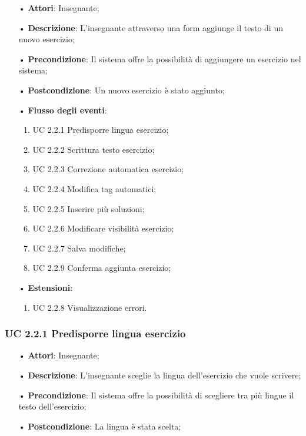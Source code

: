 \begin{itemize}
	\item[•] \textbf{Attori}: Insegnante;
	\item[•] \textbf{Descrizione}: L'insegnante attraverso una form aggiunge il testo di un nuovo esercizio;
	\item[•] \textbf{Precondizione}: Il sistema offre la possibilità di aggiungere un esercizio nel sistema;
	\item[•] \textbf{Postcondizione}: Un nuovo esercizio è stato aggiunto;
	\item[•] \textbf{Flusso degli eventi}:
	\begin{enumerate}
		\item UC 2.2.1 Predisporre lingua esercizio;
		\item UC 2.2.2 Scrittura testo esercizio;
		\item UC 2.2.3 Correzione automatica esercizio;
		\item UC 2.2.4 Modifica tag automatici;
		\item UC 2.2.5 Inserire più soluzioni;
		\item UC 2.2.6 Modificare visibilità esercizio;
		\item UC 2.2.7 Salva modifiche;
		\item UC 2.2.9 Conferma aggiunta esercizio;
	\end{enumerate}
	\item[•] \textbf{Estensioni}:	
	\begin{enumerate}
		\item UC 2.2.8 Visualizzazione errori.
	\end{enumerate}
\end{itemize}

\subsubsection{UC 2.2.1 Predisporre lingua esercizio}
\begin{itemize}
	\item[•] \textbf{Attori}: Insegnante;
	\item[•] \textbf{Descrizione}: L'insegnante sceglie la lingua dell’esercizio che vuole scrivere;
	\item[•] \textbf{Precondizione}: Il sistema offre la possibilità di scegliere tra più lingue il testo dell’esercizio;
	\item[•] \textbf{Postcondizione}: La lingua è stata scelta;
\end{itemize}


